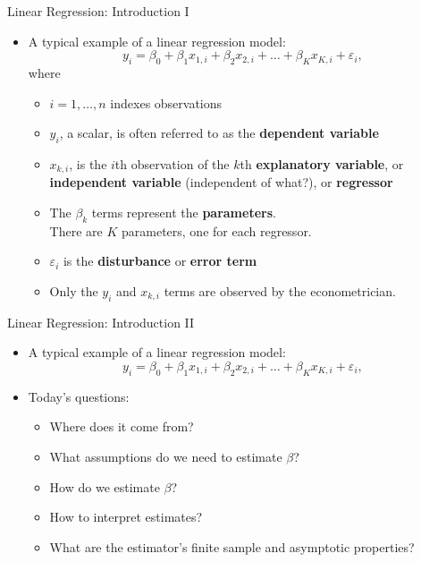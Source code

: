 \begin{frame}{Linear Regression: Introduction I}
\begin{itemize}
	\item A typical example of a linear regression model:
	\begin{equation*}
		y_i = \beta_0 + \beta_1 x_{1,i} +  \beta_2 x_{2,i} + \dots +  \beta_K x_{K,i} + \varepsilon_i,
	\end{equation*}
	where 
	\begin{itemize}
		\item<1-> $i=1,\dots,n$ indexes observations
		\smallskip
		\item<2-> $y_{i}$, a scalar, is often referred to as the {\bf dependent variable}
		\smallskip
		\item<3-> $x_{k,i}$, is the $i$th observation of the $k$th {\bf explanatory variable},
		 or {\bf independent variable} (independent of what?), or  {\bf regressor}
		\smallskip
		\item<4-> The $\beta_{k}$ terms represent the {\bf  parameters}. \\
		There are $K$ parameters, one	for each regressor.

		\smallskip
		\item<5-> $\varepsilon_{i}$ is the {\bf disturbance} or {\bf error term}
\smallskip
		\item<6-> Only the $y_{i}$ and $x_{k,i}$ terms are observed by the econometrician.
	\end{itemize}
\end{itemize}
\end{frame}


\begin{frame}{Linear Regression: Introduction II}
\begin{itemize}
	\item A typical example of a linear regression model:
	\begin{equation*}
		y_i = \beta_0 + \beta_1 x_{1,i} +  \beta_2 x_{2,i} + \dots +  \beta_K x_{K,i} + \varepsilon_i,
	\end{equation*}
	\item Today's questions: 
	\begin{itemize}
		\item Where does it come from? 
		\item What assumptions do we need to estimate $\beta$?
		\item How do we estimate $\beta$?
		\item How to interpret estimates? 
		\item What are the estimator's finite sample and asymptotic properties? 
	\end{itemize}
\end{itemize}
\end{frame}

